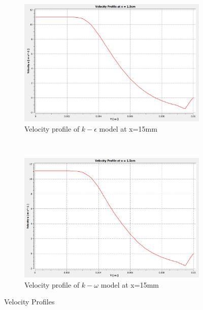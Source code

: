 \begin{figure}[H]
    ~
    \begin{subfigure}{.48\textwidth}
    \centering
    \includegraphics[width=.95\linewidth]{images/task2/task2-1/cs4.png}
    \caption{Velocity profile of $k-\epsilon$ model at x=15mm}
\end{subfigure}
    ~
    \begin{subfigure}{.48\textwidth}
    \centering
    \includegraphics[width=.95\linewidth]{images/task2/task2-2/cs4.png}
    \caption{Velocity profile of $k-\omega$ model at x=15mm}
\end{subfigure}

    \caption{Velocity Profiles}
    \label{fig:task2prof1}
\end{figure}



